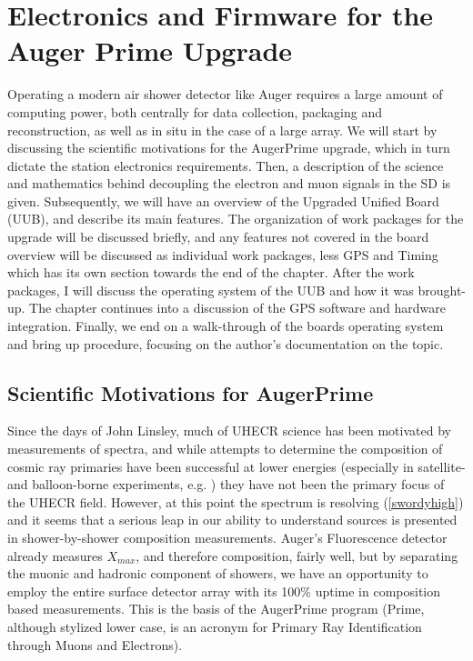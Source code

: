
\chapter{Electronics and Firmware for the Auger Prime Upgrade}
\label{electronics}
Operating a modern air shower detector like Auger requires a large amount of computing power, both centrally for data collection, packaging and reconstruction, as well as in situ in the case of a large array. We will start by discussing the scientific motivations for the AugerPrime upgrade, which in turn dictate the station electronics requirements. Then, a description of the science and mathematics behind decoupling the electron and muon signals in the SD is given. Subsequently, we will have an overview of the Upgraded Unified Board (UUB), and describe its main features. The organization of work packages for the upgrade will be discussed briefly, and any features not covered in the board overview will be discussed as individual work packages, less GPS and Timing which has its own section towards the end of the chapter. After the work packages, I will discuss the operating system of the UUB and how it was brought-up. The chapter continues into a discussion of the GPS software and hardware integration. Finally, we end on a walk-through of the boards operating system and bring up procedure, focusing on the author's documentation on the topic. %
\section{Scientific Motivations for AugerPrime}
Since the days of John Linsley, much of UHECR science has been motivated by measurements of spectra, and while attempts to determine the composition of cosmic ray primaries have been successful at lower energies (especially in satellite- and balloon-borne experiments, e.g. \textcite{tiger}) they have not been the primary focus of the UHECR field. However, at this point the spectrum is resolving (\autoref{swordyhigh}) and it seems that a serious leap in our ability to understand sources is presented in shower-by-shower composition measurements. Auger's Fluorescence detector already measures $X_{max}$, and therefore composition, fairly well, but by separating the muonic and hadronic component of showers, we have an opportunity to employ the entire surface detector array with its 100\% uptime in composition based measurements. This is the basis of the AugerPrime program (Prime, although stylized lower case, is an acronym for Primary Ray Identification through Muons and Electrons).

